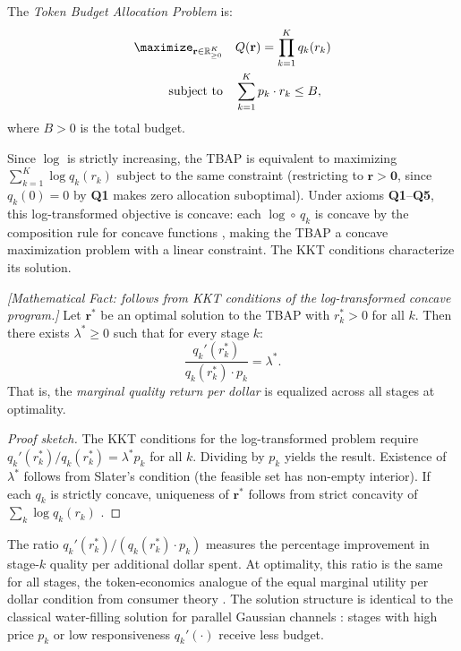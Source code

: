 \begin{definition}[TBAP]
\label{def:econ-tbap}
The \emph{Token Budget Allocation Problem} is:
\begin{equation}\label{eq:econ-tbap}
\begin{aligned}
    \maximize_{\mathbf{r} \in \mathbb{R}_{\geq 0}^K} \quad & Q(\mathbf{r}) = \prod_{k=1}^{K} q_k(r_k) \\
    \text{subject to} \quad & \sum_{k=1}^{K} p_k \cdot r_k \leq B,
\end{aligned}
\end{equation}
where $B > 0$ is the total budget.
\end{definition}

Since $\log$ is strictly increasing, the TBAP is equivalent to maximizing $\sum_{k=1}^K \log q_k(r_k)$ subject to the same constraint (restricting to $\mathbf{r} > \mathbf{0}$, since $q_k(0) = 0$ by \textbf{Q1} makes zero allocation suboptimal). Under axioms \textbf{Q1}--\textbf{Q5}, this log-transformed objective is concave: each $\log \circ\, q_k$ is concave by the composition rule for concave functions \citep{boyd2004}, making the TBAP a concave maximization problem with a linear constraint. The KKT conditions characterize its solution.

\begin{theorem}
\label{thm:econ-emr}
\emph{[Mathematical Fact: follows from KKT conditions of the log-transformed concave program.]}
Let $\mathbf{r}^*$ be an optimal solution to the TBAP with $r_k^* > 0$ for all $k$. Then there exists $\lambda^* \geq 0$ such that for every stage $k$:
\begin{equation}\label{eq:econ-emr}
    \frac{q_k'(r_k^*)}{q_k(r_k^*) \cdot p_k} = \lambda^*.
\end{equation}
That is, the \emph{marginal quality return per dollar} is equalized across all stages at optimality.
\end{theorem}

\begin{proof}[Proof sketch]
The KKT conditions for the log-transformed problem require $q_k'(r_k^*) / q_k(r_k^*) = \lambda^* p_k$ for all $k$. Dividing by $p_k$ yields the result. Existence of $\lambda^*$ follows from Slater's condition (the feasible set has non-empty interior). If each $q_k$ is strictly concave, uniqueness of $\mathbf{r}^*$ follows from strict concavity of $\sum_k \log q_k(r_k)$ \citep{rockafellar1970}.
\end{proof}

The ratio $q_k'(r_k^*) / (q_k(r_k^*) \cdot p_k)$ measures the percentage improvement in stage-$k$ quality per additional dollar spent. At optimality, this ratio is the same for all stages, the token-economics analogue of the equal marginal utility per dollar condition from consumer theory \citep{mas-colell1995}. The solution structure is identical to the classical water-filling solution for parallel Gaussian channels \citep{cover2006}: stages with high price $p_k$ or low responsiveness $q_k'(\cdot)$ receive less budget.

